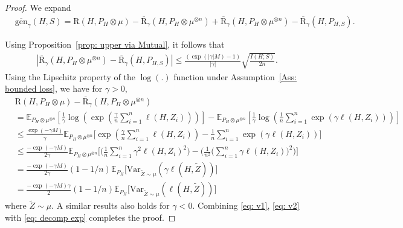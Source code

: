 \documentclass{article}
\theoremstyle{plain}
\theoremstyle{plain}
\theoremstyle{definition}
\theoremstyle{remark}
\newcommand{\var}{\mathrm{Var}}
\newcommand{\RTrue}{\mathrm{R}}
\newcommand{\RTT}{\overline{\mathrm{R}}_{\gamma}}
\newcommand{\mbE}{\mathbb{E}}
\begin{document}
\begin{proof}
We expand 
     \begin{equation}\label{eq: decomp exp}
           \begin{split}
       &\overline{\mathrm{gen}}_{\gamma}(H,S)= \RTrue(H, P_{H}\otimes \mu) -\RTT(H,P_{H}\otimes \mu^{\otimes n})
        + \RTT(H,P_{H}\otimes \mu^{\otimes n})-\RTT(H,P_{H,S}).
        \end{split}
    \end{equation}

Using Proposition~\ref{prop: upper via Mutual}, it follows that 
    \begin{equation}\label{eq: v1}\begin{split}
        |\RTT(H,P_{H}\otimes \mu^{\otimes n})-\RTT(H,P_{H,S})|\leq
        \frac{(\exp(|\gamma| M)-1)}{|\gamma|}\sqrt{\frac{ I(H;S)}{2n}}.
    \end{split}\end{equation}
   Using the Lipschitz property of the $\log(.)$ function under Assumption~\ref{Ass: bounded loss}, we have for $\gamma>0$,
  \begin{equation}\label{eq: v2}
  \begin{split}
     &\RTrue(H, P_{H}\otimes \mu) -\RTT(H,P_{H}\otimes \mu^{\otimes n})\\
     &=\mbE_{P_{H}\otimes \mu^{\otimes n}}[\frac{1}{\gamma}\log(\exp(\frac{\gamma}{n}\sum_{i=1}^n \ell(H,Z_i)))]-\mbE_{P_{H}\otimes \mu^{\otimes n}}[\frac{1}{\gamma}\log(\frac{1}{n}\sum_{i=1}^n\exp(\gamma\ell(H,Z_i)))]\\
     &\leq \frac{\exp(-\gamma M)}{\gamma}\mbE_{P_{H}\otimes \mu^{\otimes n}}\Big[\exp(\frac{\gamma}{n}\sum_{i=1}^n \ell(H,Z_i))-\frac{1}{n}\sum_{i=1}^n\exp(\gamma\ell(H,Z_i))\Big]\\
     &\leq \frac{-\exp(-\gamma M)}{2\gamma} \mbE_{P_{H}\otimes \mu^{\otimes n}}\Bigg[\Big(\frac{1}{n}\sum_{i=1}^n \gamma^2\ell(H,Z_i)^2\Big)-\Big(\frac{1}{n^2}\big(\sum_{i=1}^n \gamma\ell(H,Z_i)\big)^2 \Big)\Bigg ]\\
     &=\frac{-\exp(-\gamma M)}{2\gamma } (1-1/n)\mathbb{E}_{P_H}\big[\var_{\tilde Z\sim\mu}(\gamma\ell(H,\tilde Z))\big]\\
     &=\frac{-\exp(-\gamma M)\gamma}{2 } (1-1/n)\mathbb{E}_{P_H}\big[\var_{\tilde Z\sim\mu}(\ell(H,\tilde Z))\big]
  \end{split}
  \end{equation}
where $\tilde Z\sim \mu$. A similar results also holds for $\gamma<0$. Combining \eqref{eq: v1}, \eqref{eq: v2}  with \eqref{eq: decomp exp} completes the proof.
\end{proof}
\end{document}
